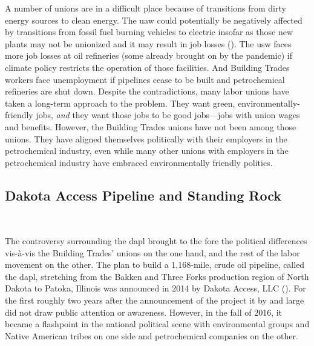 \documentclass[12pt]{article}
\begin{document}
A number of unions are in a difficult place because of transitions from dirty energy sources to clean energy. The \acrfull{uaw} could potentially be negatively affected by transitions from fossil fuel burning vehicles to electric insofar as those new plants may not be unionized and it may result in job losses (\cite{feeleyElectricVehicleFactories2023}). The \acrfull{usw} faces more job losses at oil refineries (some already brought on by the pandemic) if climate policy restricts the operation of those facilities. And Building Trades workers face unemployment if pipelines cease to be built and petrochemical refineries are shut down. Despite the contradictions, many labor unions have taken a long-term approach to the problem. They want green, environmentally-friendly jobs, \emph{and} they want those jobs to be good jobs---jobs with union wages and benefits. However, the Building Trades unions have not been among those unions. They have aligned themselves politically with their employers in the petrochemical industry, even while many other unions with employers in the petrochemical industry have embraced environmentally friendly politics.

\subsection{Dakota Access Pipeline and Standing Rock}\

The controversy surrounding the \acrfull{dapl} brought to the fore the political differences vis-\`a-vis the Building Trades' unions on the one hand, and the rest of the labor movement on the other. The plan to build a 1,168-mile, crude oil pipeline, called the \acrshort{dapl}, stretching from the Bakken and Three Forks production region of North Dakota to Patoka, Illinois was announced in 2014 by Dakota Access, LLC (\cite{oconnellDakotaAccessPipeline2018, sahaFiveThingsKnow2016, usarmycorpsofengineersDakotaAccessPipeline}). For the first roughly two years after the announcement of the project it by and large did not draw public attention or awareness. However, in the fall of 2016, it became a flashpoint in the national political scene with environmental groups and Native American tribes on one side and petrochemical companies on the other. 
\end{document}
